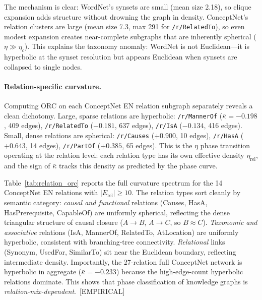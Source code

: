 \documentclass[11pt,a4paper]{article}
\newcommand{\kbar}{\bar{\kappa}}
\newcommand{\etac}{\eta_c}
\begin{document}
The mechanism is clear: WordNet's synsets are small (mean size 2.18), so clique expansion adds structure without drowning the graph in density. ConceptNet's relation clusters are large (mean size 7.3, max 291 for \texttt{/r/RelatedTo}), so even modest expansion creates near-complete subgraphs that are inherently spherical ($\eta \gg \etac$). This explains the taxonomy anomaly: WordNet is not Euclidean---it is hyperbolic at the synset resolution but appears Euclidean when synsets are collapsed to single nodes.

\paragraph{Relation-specific curvature.} Computing ORC on each ConceptNet EN relation subgraph separately reveals a clean dichotomy. Large, sparse relations are hyperbolic: \texttt{/r/MannerOf} ($\kbar = -0.198$, 409 edges), \texttt{/r/RelatedTo} ($-0.181$, 637 edges), \texttt{/r/IsA} ($-0.134$, 416 edges). Small, dense relations are spherical: \texttt{/r/Causes} ($+0.900$, 10 edges), \texttt{/r/HasA} ($+0.643$, 14 edges), \texttt{/r/PartOf} ($+0.385$, 65 edges). This is the $\eta$ phase transition operating at the relation level: each relation type has its own effective density $\eta_{\mathrm{rel}}$, and the sign of $\kbar$ tracks this density as predicted by the phase curve.

Table~\ref{tab:relation_orc} reports the full curvature spectrum for the 14 ConceptNet EN relations with $|E_{\text{rel}}| \geq 10$. The relation types sort cleanly by semantic category: \emph{causal and functional} relations (Causes, HasA, HasPrerequisite, CapableOf) are uniformly spherical, reflecting the dense triangular structure of causal closure ($A \to B$, $A \to C$, so $B \approx C$). \emph{Taxonomic and associative} relations (IsA, MannerOf, RelatedTo, AtLocation) are uniformly hyperbolic, consistent with branching-tree connectivity. \emph{Relational} links (Synonym, UsedFor, SimilarTo) sit near the Euclidean boundary, reflecting intermediate density. Importantly, the 27-relation full ConceptNet network is hyperbolic in aggregate ($\kbar = -0.233$) because the high-edge-count hyperbolic relations dominate. This shows that phase classification of knowledge graphs is \emph{relation-mix-dependent}.~[EMPIRICAL]
\end{document}
